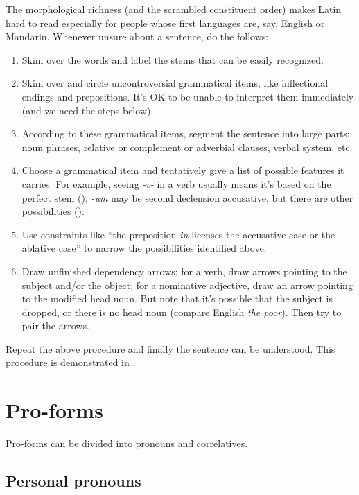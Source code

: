 \documentclass[a4paper, oneside, 12pt]{report}
\newcommand{\form}[1]{\emph{#1}}
\begin{document}
The morphological richness (and the scrambled constituent order)
makes Latin hard to read 
especially for people whose first languages are, say, 
English or Mandarin. 
Whenever unsure about a sentence, do the follows: 
\begin{enumerate}
    \item Skim over the words and label the stems that can be easily recognized.  
    \item Skim over and circle uncontroversial grammatical items,  
        like inflectional endings and prepositions. 
        It's OK to be unable to interpret them immediately (and we need the steps below).
    \item According to these grammatical items, 
        segment the sentence into large parts:
        noun phrases, relative or complement or adverbial clauses, 
        verbal system, etc.
    \item Choose a grammatical item and tentatively give a list of possible features it carries.  
        For example, seeing \form{-v-} in a verb usually means
        it's based on the perfect stem
        ();
        \form{-um} may be second declension accusative,
        but there are other possibilities
        (). 
    \item Use constraints like 
        ``the preposition \form{in} licenses the accusative case or the ablative case'' 
        to narrow the possibilities identified above.
    \item Draw unfinished dependency arrows:
        for a verb, draw arrows pointing to the subject and/or the object; 
        for a nominative adjective, draw an arrow pointing to the modified head noun. 
        But note that it's possible that the subject is dropped, 
        or there is no head noun (compare English \form{the poor}).
        Then try to pair the arrows.
\end{enumerate}
Repeat the above procedure and finally the sentence can be understood. 
This procedure is demonstrated in .


\chapter{Pro-forms}\label{chap:pro-forms}


Pro-forms can be divided into pronouns and correlatives.


\section{Personal pronouns}
\end{document}
